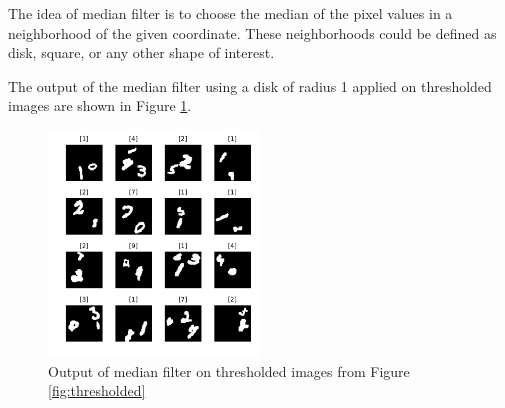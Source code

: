\documentclass[letterpaper, 10 pt, conference]{ieeeconf}  %
\begin{document}
The idea of median filter is to choose the median of the pixel values in a neighborhood of the given coordinate. These neighborhoods could be defined as disk, square, or any other shape of interest.


The output of the median filter using a disk of radius 1 applied on thresholded images are shown in Figure \ref{fig:thresholdmed}.
\begin{figure}[h]
	\begin{center}
		\includegraphics[width=0.5\textwidth]{figures/thresholdmedDataset.pdf}  %
		\caption{Output of median filter on thresholded images from Figure \ref{fig:thresholded}}
		\label{fig:thresholdmed}
	\end{center}
\end{figure}
\end{document}
